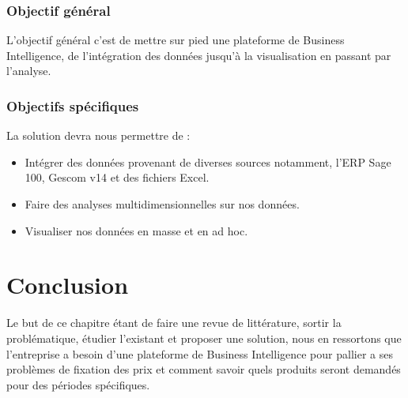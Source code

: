 \subsubsection{Objectif général}
L’objectif général c’est de mettre sur pied une plateforme de Business Intelligence, de l’intégration des données jusqu’à la visualisation en passant par l’analyse. 

\subsubsection{Objectifs spécifiques}
La solution devra nous permettre de :
\begin{itemize}
    \item Intégrer des données provenant de diverses sources notamment, l’ERP Sage 100, Gescom v14 et des fichiers Excel.
    \item Faire des analyses multidimensionnelles sur nos données.
    \item Visualiser nos données en masse et en ad hoc.
\end{itemize}










\section*{Conclusion}%
%
Le but de ce chapitre étant de faire une revue de littérature, sortir la problématique, étudier l’existant et proposer une solution, nous en ressortons que l’entreprise a besoin d’une plateforme de Business Intelligence pour pallier a ses problèmes de fixation des prix et comment savoir quels produits seront demandés pour des périodes spécifiques.
